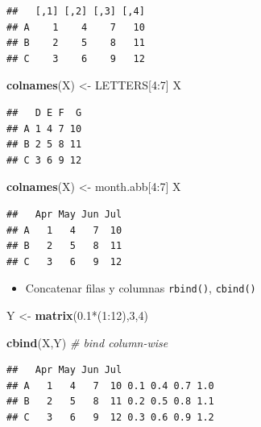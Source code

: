 \documentclass[]{article}
\def\tightlist{}
\newenvironment{Shaded}{\begin{snugshade}}{\end{snugshade}}
\newcommand{\KeywordTok}[1]{\textcolor[rgb]{0.13,0.29,0.53}{\textbf{{#1}}}}
\newcommand{\DecValTok}[1]{\textcolor[rgb]{0.00,0.00,0.81}{{#1}}}
\newcommand{\FloatTok}[1]{\textcolor[rgb]{0.00,0.00,0.81}{{#1}}}
\newcommand{\StringTok}[1]{\textcolor[rgb]{0.31,0.60,0.02}{{#1}}}
\newcommand{\CommentTok}[1]{\textcolor[rgb]{0.56,0.35,0.01}{\textit{{#1}}}}
\newcommand{\NormalTok}[1]{{#1}}
\numberwithin{equation}{section}
\begin{document}
\begin{verbatim}
##   [,1] [,2] [,3] [,4]
## A    1    4    7   10
## B    2    5    8   11
## C    3    6    9   12
\end{verbatim}

\begin{Shaded}
\begin{Highlighting}[]
\KeywordTok{colnames}\NormalTok{(X) <-}\StringTok{ }\NormalTok{LETTERS[}\DecValTok{4}\NormalTok{:}\DecValTok{7}\NormalTok{]}
\NormalTok{X}
\end{Highlighting}
\end{Shaded}

\begin{verbatim}
##   D E F  G
## A 1 4 7 10
## B 2 5 8 11
## C 3 6 9 12
\end{verbatim}

\begin{Shaded}
\begin{Highlighting}[]
\KeywordTok{colnames}\NormalTok{(X) <-}\StringTok{ }\NormalTok{month.abb[}\DecValTok{4}\NormalTok{:}\DecValTok{7}\NormalTok{]}
\NormalTok{X}
\end{Highlighting}
\end{Shaded}

\begin{verbatim}
##   Apr May Jun Jul
## A   1   4   7  10
## B   2   5   8  11
## C   3   6   9  12
\end{verbatim}

\begin{itemize}
\tightlist
\item
  Concatenar filas y columnas \texttt{rbind()}, \texttt{cbind()}
\end{itemize}

\begin{Shaded}
\begin{Highlighting}[]
\NormalTok{Y <-}\StringTok{ }\KeywordTok{matrix}\NormalTok{(}\FloatTok{0.1}\NormalTok{*(}\DecValTok{1}\NormalTok{:}\DecValTok{12}\NormalTok{),}\DecValTok{3}\NormalTok{,}\DecValTok{4}\NormalTok{)}

\KeywordTok{cbind}\NormalTok{(X,Y)  }\CommentTok{# bind column-wise}
\end{Highlighting}
\end{Shaded}

\begin{verbatim}
##   Apr May Jun Jul                
## A   1   4   7  10 0.1 0.4 0.7 1.0
## B   2   5   8  11 0.2 0.5 0.8 1.1
## C   3   6   9  12 0.3 0.6 0.9 1.2
\end{verbatim}
\end{document}
